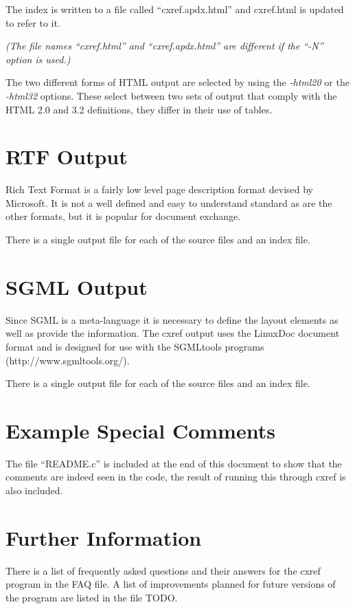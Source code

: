 \documentclass{report}
\begin{document}
The index is written to a file called ``cxref.apdx.html'' and cxref.html is
updated to refer to it.

{\it (The file names ``cxref.html'' and ``cxref.apdx.html'' are different if the ``-N''
option is used.)}

The two different forms of HTML output are selected by using the {\it-html20} or the
{\it -html32} options.  These select between two sets of output that comply with the
HTML 2.0 and 3.2 definitions, they differ in their use of tables.

\section{RTF Output}

Rich Text Format is a fairly low level page description format devised by
Microsoft.  It is not a well defined and easy to understand standard as are the
other formats, but it is popular for document exchange.

There is a single output file for each of the source files and an index file.

\section{SGML Output}

Since SGML is a meta-language it is necessary to define the layout elements as
well as provide the information.  The cxref output uses the LinuxDoc document
format and is designed for use with the SGMLtools programs
(http://www.sgmltools.org/).

There is a single output file for each of the source files and an index file.

\section{Example Special Comments}

The file ``README.c'' is included at the end of this document to show that the
comments are indeed seen in the code, the result of running this through cxref
is also included.

\section{Further Information}

There is a list of frequently asked questions and their answers for the cxref
program in the FAQ file.  A list of improvements planned for future versions of
the program are listed in the file TODO.
\end{document}

